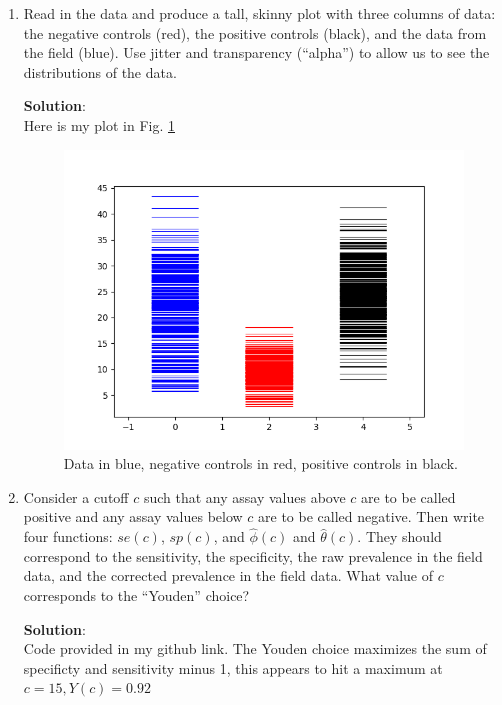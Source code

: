 \documentclass[11pt]{article}
\begin{document}
\begin{enumerate}
\begin{enumerate}[label=\alph*.]
	\item Read in the data and produce a tall, skinny plot with three columns of data: the negative controls (red), the positive controls (black), and the data from the field (blue). Use jitter and transparency (``alpha'') to allow us to see the distributions of the data. 
	
	\begin{tcolorbox}[breakable]
		\textbf{Solution}:\\
		Here is my plot in Fig. \ref{fig:posneg}
	\end{tcolorbox}
\begin{figure}
	\centering
	\includegraphics{p3p1.png}
	\caption{Data in blue, negative controls in red, positive controls in black.}
	\label{fig:posneg}
\end{figure}
	
	\item Consider a cutoff $c$ such that any assay values above $c$ are to be called positive and any assay values below $c$ are to be called negative. Then write four functions: $se(c)$, $sp(c)$, and $\hat{\phi}(c)$ and $\hat{\theta}(c)$. They should correspond to the sensitivity, the specificity, the raw prevalence in the field data, and the corrected prevalence in the field data. What value of $c$ corresponds to the ``Youden'' choice?
	
	\begin{tcolorbox}[breakable]
		\textbf{Solution}:\\
		Code provided in my github link. The Youden choice maximizes the sum of specificty and sensitivity minus 1, this appears to hit a maximum at $c=15, Y(c)=0.92$
	\end{tcolorbox}
	

\end{enumerate}
\end{enumerate}
\end{document}
